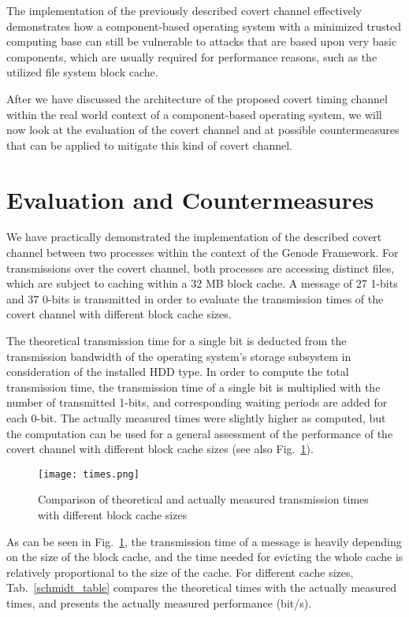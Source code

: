 \documentclass[runningheads,a4paper]{llncs}
\begin{document}
The implementation of the previously described covert channel effectively demonstrates how a component-based operating system with a minimized trusted computing base can still be vulnerable to attacks that are based upon very basic components, which are usually required for performance reasons, such as the utilized file system block cache.
 
After we have discussed the architecture of the proposed covert timing channel within the real world context of a component-based operating system, we will now look at the evaluation of the covert channel and at possible countermeasures that can be applied to mitigate this kind of covert channel.

\section{Evaluation and Countermeasures}\label{sec5}

We have practically demonstrated the implementation of the described covert channel between two processes within the context of the Genode Framework.
For transmissions over the covert channel, both processes are accessing distinct files, which are subject to caching within a 32 MB block cache.
A message of 27 1-bits and 37 0-bits is transmitted in order to evaluate the transmission times of the covert channel with different block cache sizes.

The theoretical transmission time for a single bit is deducted from the transmission bandwidth of the operating system's storage subsystem in consideration of the installed HDD type.
In order to compute the total transmission time, the transmission time of a single bit is multiplied with the number of transmitted 1-bits, and corresponding waiting periods are added for each 0-bit.
The actually measured times were slightly higher as computed, but the computation can be used for a general assessment of the performance of the covert channel with different block cache sizes (see also Fig.~\ref{times}).

\begin{figure}[!ht]
\texttt{[image: times.png]}
\caption{Comparison of theoretical and actually measured transmission times with different block cache sizes}
\label{times}
\end{figure}

As can be seen in Fig.~\ref{times}, the transmission time of a message is heavily depending on the size of the block cache, and the time needed for evicting the whole cache is relatively proportional to the size of the cache.
For different cache sizes, Tab.~\ref{schmidt_table} compares the theoretical times with the actually measured times, and presents the actually measured performance (bit/s).
\end{document}
